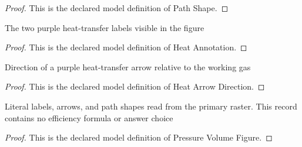 \begin{proof}
  This is the declared model definition of Path Shape.
\end{proof}
\begin{definition}
  \label{def:physics:phyx-mini-0437:phyxminiproblems-problemphyxmini0437-heatannotation}
  The two purple heat-transfer labels visible in the figure
\end{definition}
\begin{proof}
  This is the declared model definition of Heat Annotation.
\end{proof}
\begin{definition}
  \label{def:physics:phyx-mini-0437:phyxminiproblems-problemphyxmini0437-heatarrowdirection}
  Direction of a purple heat-transfer arrow relative to the working gas
\end{definition}
\begin{proof}
  This is the declared model definition of Heat Arrow Direction.
\end{proof}
\begin{definition}
  \label{def:physics:phyx-mini-0437:phyxminiproblems-problemphyxmini0437-pressurevolumefigure}
  Literal labels, arrows, and path shapes read from the primary raster. This record contains no efficiency formula or answer choice
\end{definition}
\begin{proof}
  This is the declared model definition of Pressure Volume Figure.
\end{proof}
